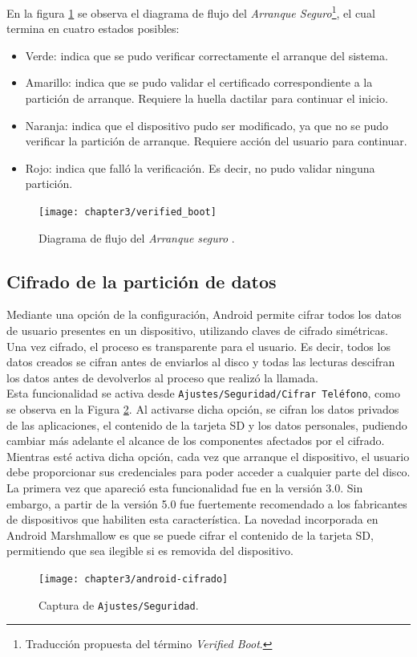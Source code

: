 En la figura \ref{fig:ch03:verifyBoot} se observa el diagrama de flujo del \textit{Arranque Seguro}\footnote{Traducción propuesta del término \textit{Verified Boot}.}, el cual termina en cuatro estados posibles:
\begin{itemize}
	\item Verde: indica que se pudo verificar correctamente el arranque del sistema.
	\item Amarillo: indica que se pudo validar el certificado correspondiente a la partición de arranque. Requiere la huella dactilar para continuar el inicio.
	\item Naranja: indica que el dispositivo pudo ser modificado, ya que no se pudo verificar la partición de arranque. Requiere acción del usuario para continuar.
	\item Rojo: indica que falló la verificación. Es decir, no pudo validar ninguna partición.
\end{itemize}
\begin{figure}[htbp]
	\begin{center}
		\texttt{[image: chapter3/verified\_boot]}
		\caption{Diagrama de flujo del \textit{Arranque seguro} \cite{asreview2015}.}
		\label{fig:ch03:verifyBoot}
	\end{center}
\end{figure}
\subsection{Cifrado de la partición de datos}
Mediante una opción de la configuración, Android permite cifrar todos los datos de usuario presentes en un dispositivo, utilizando claves de cifrado simétricas. Una vez cifrado, el proceso es transparente para el usuario. Es decir, todos los datos creados se cifran antes de enviarlos al disco y todas las lecturas descifran los datos antes de devolverlos al proceso que realizó la llamada.\\

Esta funcionalidad se activa desde \texttt{Ajustes/Seguridad/Cifrar Teléfono}, como se observa en la Figura \ref{fig:ch03:android-cifrado}. Al activarse dicha opción, se cifran los datos privados de las aplicaciones, el contenido de la tarjeta SD y los datos personales, pudiendo cambiar más adelante el alcance de los componentes afectados por el cifrado. Mientras esté activa dicha opción, cada vez que arranque el dispositivo, el usuario debe proporcionar sus credenciales para poder acceder a cualquier parte del disco.\\
La primera vez que apareció esta funcionalidad fue en la versión 3.0. Sin embargo, a partir de la versión 5.0 fue fuertemente recomendado a los fabricantes de dispositivos que habiliten esta característica. La novedad incorporada en Android Marshmallow es que se puede cifrar el contenido de la tarjeta SD, permitiendo que sea ilegible si es removida del dispositivo.
\begin{figure}[htbp]
	\begin{center}
		\texttt{[image: chapter3/android-cifrado]}
		\caption{Captura de \texttt{Ajustes/Seguridad}.}
		\label{fig:ch03:android-cifrado}
	\end{center}
\end{figure}

